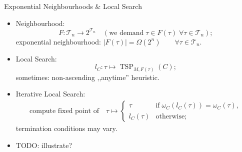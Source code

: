 \documentclass[
  size=8pt,
  style=klope,
  paper=screen,
  pauseslide,
  nopagebreaks,
  hlsections,
  fleqn
]{powerdot}
\def\todo{\color{red}}
\def\eqitspace{\vspace{-5mm}}
\begin{document}
\begin{slide}{Exponential Neighbourhoods \& Local Search}
\begin{itemize}
  \item
  Neighbourhood:
  \begin{equation}
    F: \mathcal{T}_n \to 2^{\mathcal{T}_n}
    \quad \left(\text{we demand}\; \tau \in F\left(\tau\right) \; \forall \tau \in \mathcal{T}_n\right);
  \end{equation}
  exponential neighbourhood:
  $\left\vert F(\tau) \right\vert = \Omega(2^n) \qquad \forall \tau \in \mathcal{T}_n$.
  \item
  Local Search:
  \begin{equation}
    l_C: \tau \mapsto \operatorname{TSP}_{M,F(\tau)}\left(C\right);
  \end{equation}
  sometimes: non-ascending ,,anytime'' heuristic.
  \item
  Iterative Local Search:
  \begin{align}
    \text{compute fixed point of}
    \quad
    \tau \mapsto
    \begin{cases}
      \tau \quad & \text{if} \; \omega_C\left(l_C\left(\tau\right)\right) = \omega_C\left(\tau\right),
      \\
      l_C\left(\tau\right) & \text{otherwise};
    \end{cases}
  \end{align}
  termination conditions may vary.
  \item
  {\todo TODO:} illustrate?
\end{itemize}
\end{slide}
\end{document}
